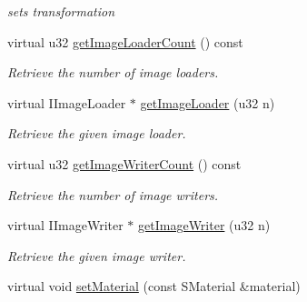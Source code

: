 \begin{DoxyCompactItemize}
\begin{DoxyCompactList}\small\item\em sets transformation \end{DoxyCompactList}\item 
\hypertarget{classirr_1_1video_1_1_c_null_driver_a858bf8d6bd1978e21dae0e6472d9b7e8}{virtual u32 \hyperlink{classirr_1_1video_1_1_c_null_driver_a858bf8d6bd1978e21dae0e6472d9b7e8}{get\-Image\-Loader\-Count} () const }\label{classirr_1_1video_1_1_c_null_driver_a858bf8d6bd1978e21dae0e6472d9b7e8}

\begin{DoxyCompactList}\small\item\em Retrieve the number of image loaders. \end{DoxyCompactList}\item 
\hypertarget{classirr_1_1video_1_1_c_null_driver_ab7cad39b73bf79585067e46b535da269}{virtual I\-Image\-Loader $\ast$ \hyperlink{classirr_1_1video_1_1_c_null_driver_ab7cad39b73bf79585067e46b535da269}{get\-Image\-Loader} (u32 n)}\label{classirr_1_1video_1_1_c_null_driver_ab7cad39b73bf79585067e46b535da269}

\begin{DoxyCompactList}\small\item\em Retrieve the given image loader. \end{DoxyCompactList}\item 
\hypertarget{classirr_1_1video_1_1_c_null_driver_a2daf871ee1069bed965c9b0c84e53735}{virtual u32 \hyperlink{classirr_1_1video_1_1_c_null_driver_a2daf871ee1069bed965c9b0c84e53735}{get\-Image\-Writer\-Count} () const }\label{classirr_1_1video_1_1_c_null_driver_a2daf871ee1069bed965c9b0c84e53735}

\begin{DoxyCompactList}\small\item\em Retrieve the number of image writers. \end{DoxyCompactList}\item 
\hypertarget{classirr_1_1video_1_1_c_null_driver_a88a1bfbb9871e03818359db1877f5248}{virtual I\-Image\-Writer $\ast$ \hyperlink{classirr_1_1video_1_1_c_null_driver_a88a1bfbb9871e03818359db1877f5248}{get\-Image\-Writer} (u32 n)}\label{classirr_1_1video_1_1_c_null_driver_a88a1bfbb9871e03818359db1877f5248}

\begin{DoxyCompactList}\small\item\em Retrieve the given image writer. \end{DoxyCompactList}\item 
\hypertarget{classirr_1_1video_1_1_c_null_driver_ade7f3623a6a83c88d33daa3889aceb5f}{virtual void \hyperlink{classirr_1_1video_1_1_c_null_driver_ade7f3623a6a83c88d33daa3889aceb5f}{set\-Material} (const S\-Material \&material)}\label{classirr_1_1video_1_1_c_null_driver_ade7f3623a6a83c88d33daa3889aceb5f}


\end{DoxyCompactItemize}
